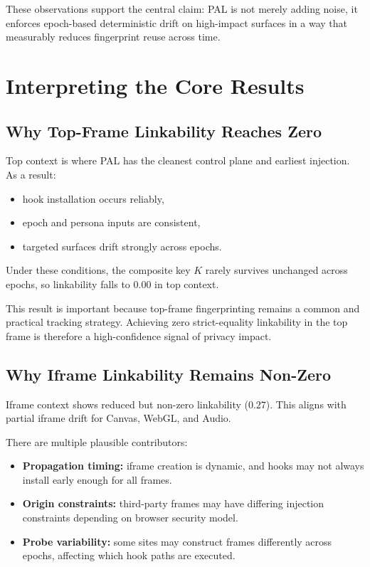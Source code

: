\documentclass[11pt]{report}
\begin{document}
These observations support the central claim: PAL is not merely adding noise, it enforces epoch-based deterministic drift on high-impact surfaces in a way that measurably reduces fingerprint reuse across time.

\section{Interpreting the Core Results}

\subsection{Why Top-Frame Linkability Reaches Zero}

Top context is where PAL has the cleanest control plane and earliest injection. As a result:

\begin{itemize}
    \item hook installation occurs reliably,
    \item epoch and persona inputs are consistent,
    \item targeted surfaces drift strongly across epochs.
\end{itemize}

Under these conditions, the composite key $K$ rarely survives unchanged across epochs, so linkability falls to $0.00$ in top context.

This result is important because top-frame fingerprinting remains a common and practical tracking strategy. Achieving zero strict-equality linkability in the top frame is therefore a high-confidence signal of privacy impact.

\subsection{Why Iframe Linkability Remains Non-Zero}

Iframe context shows reduced but non-zero linkability ($0.27$). This aligns with partial iframe drift for Canvas, WebGL, and Audio.

There are multiple plausible contributors:

\begin{itemize}
    \item \textbf{Propagation timing:} iframe creation is dynamic, and hooks may not always install early enough for all frames.
    \item \textbf{Origin constraints:} third-party frames may have differing injection constraints depending on browser security model.
    \item \textbf{Probe variability:} some sites may construct frames differently across epochs, affecting which hook paths are executed.
\end{itemize}
\end{document}
